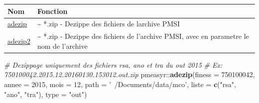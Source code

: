 \documentclass[]{book}
\newenvironment{Shaded}{\begin{snugshade}}{\end{snugshade}}
\newcommand{\KeywordTok}[1]{\textcolor[rgb]{0.13,0.29,0.53}{\textbf{{#1}}}}
\newcommand{\DataTypeTok}[1]{\textcolor[rgb]{0.13,0.29,0.53}{{#1}}}
\newcommand{\DecValTok}[1]{\textcolor[rgb]{0.00,0.00,0.81}{{#1}}}
\newcommand{\StringTok}[1]{\textcolor[rgb]{0.31,0.60,0.02}{{#1}}}
\newcommand{\CommentTok}[1]{\textcolor[rgb]{0.56,0.35,0.01}{\textit{{#1}}}}
\newcommand{\NormalTok}[1]{{#1}}
\begin{document}
\begin{longtable}[]{@{}ll@{}}
\toprule
\begin{minipage}[b]{0.10\columnwidth}\raggedright\strut
Nom\strut
\end{minipage} & \begin{minipage}[b]{0.84\columnwidth}\raggedright\strut
Fonction\strut
\end{minipage}\tabularnewline
\midrule
\endhead
\begin{minipage}[t]{0.10\columnwidth}\raggedright\strut
\href{https://github.com/IM-APHP/pmeasyr/tree/master/Rd_md/adezip.Rmd}{adezip}\strut
\end{minipage} & \begin{minipage}[t]{0.84\columnwidth}\raggedright\strut
\textasciitilde{} *.zip - Dezippe des fichiers de larchive PMSI\strut
\end{minipage}\tabularnewline
\begin{minipage}[t]{0.10\columnwidth}\raggedright\strut
\href{https://github.com/IM-APHP/pmeasyr/tree/master/Rd_md/adezip2.Rmd}{adezip2}\strut
\end{minipage} & \begin{minipage}[t]{0.84\columnwidth}\raggedright\strut
\textasciitilde{} *.zip - Dezippe des fichiers de l'archive PMSI, avec
en parametre le nom de l'archive\strut
\end{minipage}\tabularnewline
\bottomrule
\end{longtable}

\begin{Shaded}
\begin{Highlighting}[]
\CommentTok{# Dezippage uniquement des fichiers rsa, ano et tra du out 2015}
\CommentTok{# Ex: 750100042.2015.12.20160130.153012.out.zip}
\NormalTok{pmeasyr::}\KeywordTok{adezip}\NormalTok{(}\DataTypeTok{finess =} \DecValTok{750100042}\NormalTok{, }
                \DataTypeTok{annee =} \DecValTok{2015}\NormalTok{, }
                \DataTypeTok{mois =} \DecValTok{12}\NormalTok{, }
                \DataTypeTok{path =} \StringTok{'~/Documents/data/mco'}\NormalTok{, }
                \DataTypeTok{liste =} \KeywordTok{c}\NormalTok{(}\StringTok{"rsa"}\NormalTok{, }\StringTok{"ano"}\NormalTok{, }\StringTok{"tra"}\NormalTok{), }
                \DataTypeTok{type =} \StringTok{"out"}\NormalTok{)}
\end{Highlighting}
\end{Shaded}
\end{document}
